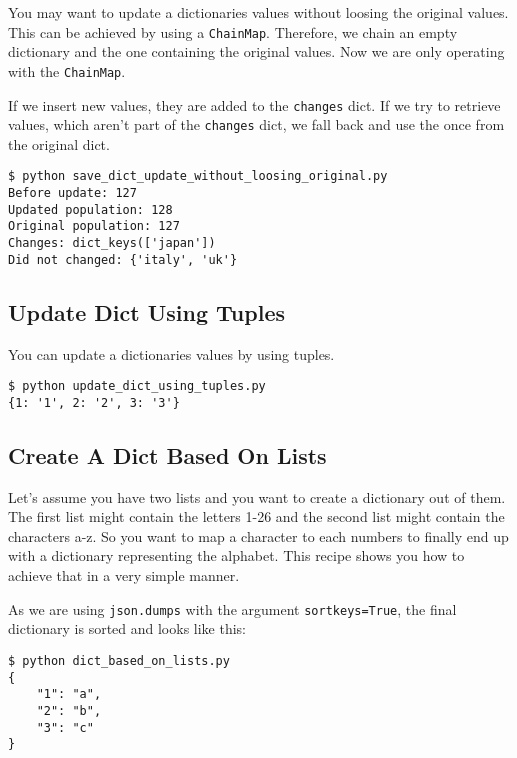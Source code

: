 You may want to update a dictionaries values without loosing the original values.
This can be achieved by using a \lstinline{ChainMap}.
Therefore, we chain an empty dictionary and the one containing the original values.
Now we are only operating with the \lstinline{ChainMap}.



If we insert new values, they are added to the \lstinline{changes} dict.
If we try to retrieve values, which aren't part of the \lstinline{changes} dict, we fall back and use the once from the original dict.

\begin{lstlisting}[caption=Output of save\_dict\_update\_without\_loosing\_original.py]
$ python save_dict_update_without_loosing_original.py
Before update: 127
Updated population: 128
Original population: 127
Changes: dict_keys(['japan'])
Did not changed: {'italy', 'uk'}
\end{lstlisting}


\subsection{Update Dict Using Tuples}

You can update a dictionaries values by using tuples.



\begin{lstlisting}[caption=Output of update\_dict\_using\_tuples.py]
$ python update_dict_using_tuples.py
{1: '1', 2: '2', 3: '3'}
\end{lstlisting}


\subsection{Create A Dict Based On Lists}

Let's assume you have two lists and you want to create a dictionary out of them.
The first list might contain the letters 1-26 and the second list might contain the characters a-z.
So you want to map a character to each numbers to finally end up with a dictionary representing the alphabet.
This recipe shows you how to achieve that in a very simple manner.



As we are using \lstinline{json.dumps} with the argument \lstinline{sortkeys=True}, the final dictionary is sorted and looks like this:

\begin{lstlisting}[caption=Output of dict\_based\_on\_lists.py]
$ python dict_based_on_lists.py
{
    "1": "a",
    "2": "b",
    "3": "c"
}
\end{lstlisting}
